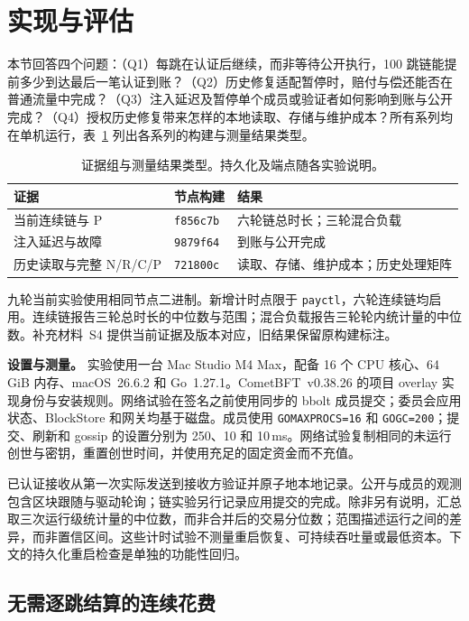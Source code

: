 \section{实现与评估}
\label{sec:evaluation}
本节回答四个问题：（Q1）每跳在认证后继续，而非等待公开执行，100 跳链能提前多少到达最后一笔认证到账？（Q2）历史修复适配暂停时，赔付与偿还能否在普通流量中完成？（Q3）注入延迟及暂停单个成员或验证者如何影响到账与公开完成？（Q4）授权历史修复带来怎样的本地读取、存储与维护成本？所有系列均在单机运行，表~\ref{tab:eval-builds} 列出各系列的构建与测量结果类型。


\begin{table}[!t]
\caption{证据组与测量结果类型。持久化及端点随各实验说明。}
\label{tab:eval-builds}
\centering\small
\setlength{\tabcolsep}{3pt}
\begin{tabular}{@{}p{}p{}p{}@{}}
\toprule
证据 & 节点构建 & 结果 \\
\midrule
当前连续链与 P & \texttt{f856c7b} & 六轮链总时长；三轮混合负载 \\
注入延迟与故障 & \texttt{9879f64} & 到账与公开完成 \\
历史读取与完整 N/R/C/P & \texttt{721800c} & 读取、存储、维护成本；历史处理矩阵 \\
\bottomrule
\end{tabular}
\end{table}

九轮当前实验使用相同节点二进制。新增计时点限于 \texttt{payctl}，六轮连续链均启用。连续链报告三轮总时长的中位数与范围；混合负载报告三轮轮内统计量的中位数。补充材料~S4 提供当前证据及版本对应，旧结果保留原构建标注。

\noindent\textbf{设置与测量。}
实验使用一台 Mac Studio M4 Max，配备 16 个 CPU 核心、64\,GiB 内存、macOS~26.6.2 和 Go~1.27.1。CometBFT~v0.38.26 的项目 overlay 实现身份与安装规则。网络试验在签名之前使用同步的 bbolt 成员提交；委员会应用状态、BlockStore 和网关均基于磁盘。成员使用 \texttt{GOMAXPROCS=16} 和 \texttt{GOGC=200}；提交、刷新和 gossip 的设置分别为 250、10 和 10\,ms。网络试验复制相同的未运行创世与密钥，重置创世时间，并使用充足的固定资金而不充值。

已认证接收从第一次实际发送到接收方验证并原子地本地记录。公开与成员的观测包含区块跟随与驱动轮询；链实验另行记录应用提交的完成。除非另有说明，汇总取三次运行级统计量的中位数，而非合并后的交易分位数；范围描述运行之间的差异，而非置信区间。这些计时试验不测量重启恢复、可持续吞吐量或最低资本。下文的持久化重启检查是单独的功能性回归。

\subsection{无需逐跳结算的连续花费}
\label{sec:eval-continuation}


